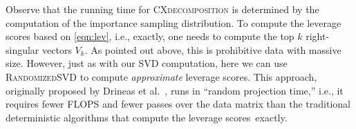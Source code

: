 Observe that the running time for \textsc{CXdecomposition} is determined by the computation of the importance sampling distribution.
To compute the leverage scores based on \eqref{eqn:lev}, i.e., exactly, one needs to compute the top $k$ right-singular vectors $V_k$. 
As pointed out above, this is prohibitive data with massive size.
However, just as with our SVD computation, here we can use \textsc{RandomizedSVD} to compute {\it approximate} leverage scores.
This approach, originally proposed by Drineas et al.~\cite{DMMW12_JMLR}, runs in ``random projection time,'' i.e., it requires fewer FLOPS and fewer passes over the data matrix than the traditional deterministic algorithms that compute the leverage scores~exactly.




